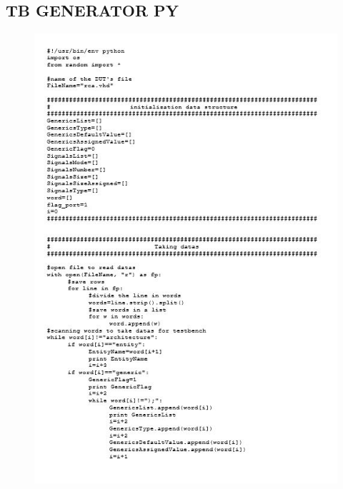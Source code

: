 \subsection{TB GENERATOR PY}
\begin{figure}[!htb]
	\centering
	\includegraphics[scale=1.2]{immagini/tbgen1}
	\label{tbgen1}
\end{figure}
